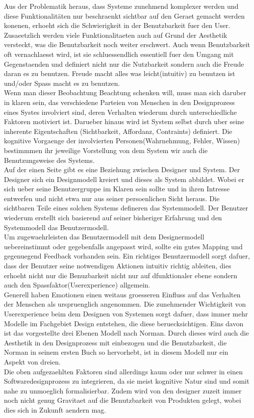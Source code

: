 \documentclass[parskip,headsepline, headtopline, %
footsepline, oneside, 12pt, headings=small]{scrreprt}
\begin{document}
Aus der Problematik heraus, dass Systeme zunehmend komplexer werden und diese Funktionalitäten nur beschraenkt sichtbar auf den Geraet gemacht werden konenen, erhoeht sich die Schwierigkeit in der Benutzbarkeit fuer den User. Zusaeetzlich werden viele Funktionalitaeten auch auf Grund der Aesthetik versteckt, was die  Benutzbarkeit noch weiter erschwert. Auch wenn Benutzbarkeit oft vernachlaesst wird, ist sie schluessendlich essentiell fuer den Umgang mit Gegenstaenden und definiert nicht nur die Nutzbarkeit sondern auch die Freude daran es zu benutzen. Freude macht alles was leicht(intuitiv) zu benutzen ist und/oder Spass macht es zu benutzen. \\
Wenn man dieser Beobachtung Beachtung schenken will, muss man sich daruber in klaren sein, das verschiedene Parteien von Menschen in den Designprozess  eines Systes involviert sind, deren Verhalten wiederum durch unterschiedliche Faktoren motiviert ist. Darueber hinaus wird ist System selbst durch uber seine inherente Eigentschaften (Sichtbarkeit, Affordanz, Contraints) definiert. Die kognitive Vorgaenge der involvierten Personen(Wahrnehmung, Fehler, Wissen) bestimmmen ihr jeweilige Vorstellung von dem System wir auch die Benutzungsweise des Systems. \\ 
Auf der einen Seite gibt es eine Beziehung zwischen Designer und System. Der Designer sich ein Designmodell kreiert und dieses als System abbildet. Wobei er sich ueber seine Benutzergruppe im Klaren sein sollte und in ihren Intresse entwerfen und nicht etwa nur aus seiner persoenlichen Sicht heraus.
Die sichtbaren Teile eines solchen Systems defineren das Systemmodell. Der Benutzer wiederum erstellt sich basierend auf seiner bisheriger Erfahrung und den Systemmodell das Benutzermodell.\\
Um zugewaehrleisten das Benutzermodell mit dem Designermodell uebereinstimmt oder gegebenfalls angepasst wird, sollte ein gutes Mapping und gegenuegend Feedback vorhanden sein. Ein richtiges Benutzermodell sorgt dafuer, dass der Benutzer seine notwendigen Aktionen intuitiv richtig ableiten, dies erhoeht nicht nur die Benuzbarkeit nicht nur auf dfunktionaler ebene sondern auch den Spassfaktor(Userexperience) allgemein. \\ 
Generell haben Emotionen einen weitaus groesseren Einfluss auf das Verhalten der Menschen als urspruenglich angenommen. Die zunehmender Wichtigkeit von Userexperience beim dem Designen von Systemen sorgt dafuer, dass immer mehr Modelle im Fachgebiet Design entstehen, die diese beruecksichtigen.
Eins davon ist das vorgestellte drei Ebenen Modell nach Norman. Durch dieses wird auch die Aesthetik in den Designprozess mit einbezogen und die Benutzbarkeit, die Norman in seinem ersten Buch so hervorhebt, ist in diesem Modell nur ein Aspekt von dreien. \\
Die oben aufgezaehlten Faktoren sind allerdings kaum oder nur schwer in einen Softwaredesignprozess zu integrieren, da sie meist kognitive Natur sind und somit nahe zu unmoeglich formalisierbar. Zudem  wird von den designer zuzeit immer noch nicht genug Gravitaet auf die Benutzbarkeit von Produkten gelegt, wobei dies sich in Zukunft aendern mag.
\end{document}
